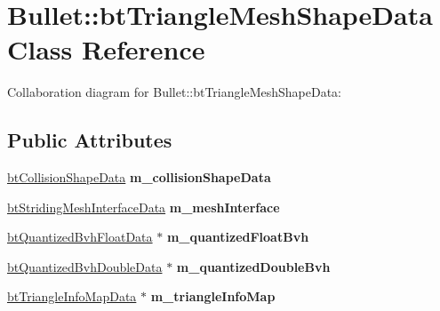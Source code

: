 \hypertarget{class_bullet_1_1bt_triangle_mesh_shape_data}{\section{Bullet\+:\+:bt\+Triangle\+Mesh\+Shape\+Data Class Reference}
\label{class_bullet_1_1bt_triangle_mesh_shape_data}
}


Collaboration diagram for Bullet\+:\+:bt\+Triangle\+Mesh\+Shape\+Data\+:
\subsection*{Public Attributes}
\begin{DoxyCompactItemize}
\item 
\hypertarget{class_bullet_1_1bt_triangle_mesh_shape_data_a6703c37b8d1a83c6175f560cf94d38a3}{\hyperlink{class_bullet_1_1bt_collision_shape_data}{bt\+Collision\+Shape\+Data} {\bfseries m\+\_\+collision\+Shape\+Data}}\label{class_bullet_1_1bt_triangle_mesh_shape_data_a6703c37b8d1a83c6175f560cf94d38a3}

\item 
\hypertarget{class_bullet_1_1bt_triangle_mesh_shape_data_a9f195c0531050d28a7a8d5701e075918}{\hyperlink{class_bullet_1_1bt_striding_mesh_interface_data}{bt\+Striding\+Mesh\+Interface\+Data} {\bfseries m\+\_\+mesh\+Interface}}\label{class_bullet_1_1bt_triangle_mesh_shape_data_a9f195c0531050d28a7a8d5701e075918}

\item 
\hypertarget{class_bullet_1_1bt_triangle_mesh_shape_data_a6c1a46b60be910f1c2dac06c0c14bf7e}{\hyperlink{class_bullet_1_1bt_quantized_bvh_float_data}{bt\+Quantized\+Bvh\+Float\+Data} $\ast$ {\bfseries m\+\_\+quantized\+Float\+Bvh}}\label{class_bullet_1_1bt_triangle_mesh_shape_data_a6c1a46b60be910f1c2dac06c0c14bf7e}

\item 
\hypertarget{class_bullet_1_1bt_triangle_mesh_shape_data_a63c91fd0392428ab024d5366989b290a}{\hyperlink{class_bullet_1_1bt_quantized_bvh_double_data}{bt\+Quantized\+Bvh\+Double\+Data} $\ast$ {\bfseries m\+\_\+quantized\+Double\+Bvh}}\label{class_bullet_1_1bt_triangle_mesh_shape_data_a63c91fd0392428ab024d5366989b290a}

\item 
\hypertarget{class_bullet_1_1bt_triangle_mesh_shape_data_ae84efa78aded2c1a9c87673013265800}{\hyperlink{class_bullet_1_1bt_triangle_info_map_data}{bt\+Triangle\+Info\+Map\+Data} $\ast$ {\bfseries m\+\_\+triangle\+Info\+Map}}\label{class_bullet_1_1bt_triangle_mesh_shape_data_ae84efa78aded2c1a9c87673013265800}


\end{DoxyCompactItemize}
